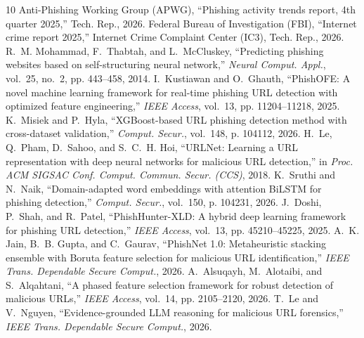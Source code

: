 \documentclass[12pt,a4paper,oneside]{report}
\begin{document}
\newpage
\begin{thebibliography}{10}
Anti-Phishing Working Group (APWG), ``Phishing activity trends report, 4th quarter 2025,'' Tech. Rep., 2026.
Federal Bureau of Investigation (FBI), ``Internet crime report 2025,'' Internet Crime Complaint Center (IC3), Tech. Rep., 2026.
R.~M. Mohammad, F.~Thabtah, and L.~McCluskey, ``Predicting phishing websites based on self-structuring neural network,'' \emph{Neural Comput. Appl.}, vol.~25, no.~2, pp. 443--458, 2014.
I.~Kustiawan and O.~Ghauth, ``PhishOFE: A novel machine learning framework for real-time phishing URL detection with optimized feature engineering,'' \emph{IEEE Access}, vol.~13, pp. 11204--11218, 2025.
K.~Misiek and P.~Hyla, ``XGBoost-based URL phishing detection method with cross-dataset validation,'' \emph{Comput. Secur.}, vol.~148, p. 104112, 2026.
H.~Le, Q.~Pham, D.~Sahoo, and S.~C.~H. Hoi, ``URLNet: Learning a URL representation with deep neural networks for malicious URL detection,'' in \emph{Proc. ACM SIGSAC Conf. Comput. Commun. Secur. (CCS)}, 2018.
K.~Sruthi and N.~Naik, ``Domain-adapted word embeddings with attention BiLSTM for phishing detection,'' \emph{Comput. Secur.}, vol.~150, p. 104231, 2026.
J.~Doshi, P.~Shah, and R.~Patel, ``PhishHunter-XLD: A hybrid deep learning framework for phishing URL detection,'' \emph{IEEE Access}, vol.~13, pp. 45210--45225, 2025.
A.~K. Jain, B.~B. Gupta, and C.~Gaurav, ``PhishNet 1.0: Metaheuristic stacking ensemble with Boruta feature selection for malicious URL identification,'' \emph{IEEE Trans. Dependable Secure Comput.}, 2026.
A.~Alsuqayh, M.~Alotaibi, and S.~Alqahtani, ``A phased feature selection framework for robust detection of malicious URLs,'' \emph{IEEE Access}, vol.~14, pp. 2105--2120, 2026.
T.~Le and V.~Nguyen, ``Evidence-grounded LLM reasoning for malicious URL forensics,'' \emph{IEEE Trans. Dependable Secure Comput.}, 2026.
\end{thebibliography}
\end{document}

